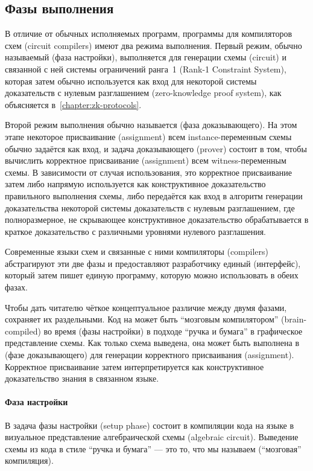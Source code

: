 \subsection{Фазы выполнения} В отличие от обычных исполняемых программ, программы для компиляторов схем (circuit compilers) имеют два режима выполнения. Первый режим, обычно называемый  (фаза настройки), выполняется для генерации схемы (circuit) и связанной с ней системы ограничений ранга~1 (Rank-1 Constraint System), которая затем обычно используется как вход для некоторой системы доказательств с нулевым разглашением (zero-knowledge proof system), как объясняется в~\ref{chapter:zk-protocols}.

Второй режим выполнения обычно называется  (фаза доказывающего). На этом этапе некоторое присваивание (assignment) всем instance-переменным схемы обычно задаётся как вход, и задача доказывающего (prover) состоит в том, чтобы вычислить корректное присваивание (assignment) всем witness-переменным схемы. В зависимости от случая использования, это корректное присваивание затем либо напрямую используется как конструктивное доказательство правильного выполнения схемы, либо передаётся как вход в алгоритм генерации доказательства некоторой системы доказательств с нулевым разглашением, где полноразмерное, не скрывающее конструктивное доказательство обрабатывается в краткое доказательство с различными уровнями нулевого разглашения.

Современные языки схем и связанные с ними компиляторы (compilers) абстрагируют эти две фазы и предоставляют разработчику единый  (интерфейс), который затем пишет единую программу, которую можно использовать в обеих фазах.

Чтобы дать читателю чёткое концептуальное различие между двумя фазами,  сохраняет их раздельными. Код на  может быть ``мозговым компилятором'' (brain-compiled) во время  (фазы настройки) в подходе ``ручка и бумага'' в графическое представление схемы. Как только схема выведена, она может быть выполнена в  (фазе доказывающего) для генерации корректного присваивания (assignment). Корректное присваивание затем интерпретируется как конструктивное доказательство знания в связанном языке.
\paragraph{Фаза настройки} В  задача фазы настройки (setup phase) состоит в компиляции кода на языке  в визуальное представление алгебраической схемы (algebraic circuit). Выведение схемы из кода в стиле ``ручка и бумага'' --- это то, что мы называем  (``мозговая'' компиляция).

